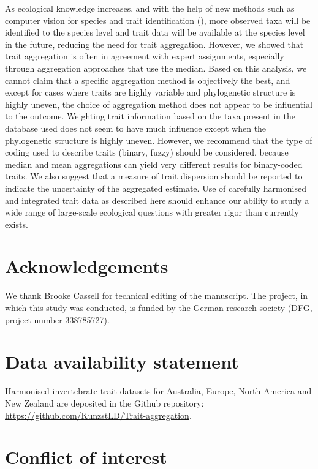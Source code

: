 \documentclass[12pt]{article}
\begin{document}
As ecological knowledge increases, and with the help of new methods such as computer vision for species and trait identification (\cite{hoye_deep_2020}), more observed taxa will be identified to the species level and trait data will be available at the species level in the future, reducing the need for trait aggregation. However, we showed that trait aggregation is often in agreement with expert assignments, especially through aggregation approaches that use the median. Based on this analysis, we cannot claim that a specific aggregation method is objectively the best, and except for cases where traits are highly variable and phylogenetic structure is highly uneven, the choice of aggregation method does not appear to be influential to the outcome. Weighting trait information based on the taxa present in the database used does not seem to have much influence except when the phylogenetic structure is highly uneven. However, we recommend that the type of coding used to describe traits (binary, fuzzy) should be considered, because median and mean aggregations can yield very different results for binary-coded traits. We also suggest that a measure of trait dispersion should be reported to indicate the uncertainty of the aggregated estimate. Use of carefully harmonised and integrated trait data as described here should enhance our ability to study a wide range of large-scale ecological questions with greater rigor than currently exists.
 

\section*{Acknowledgements}

We thank Brooke Cassell for technical editing of the manuscript. The project, in which this study was conducted, is funded by the German research society (DFG, project number 338785727).

\section*{Data availability statement}

Harmonised invertebrate trait datasets for Australia, Europe, North America and New Zealand are deposited in the Github repository: \url{https://github.com/KunzstLD/Trait-aggregation}.

\section*{Conflict of interest}
\end{document}
